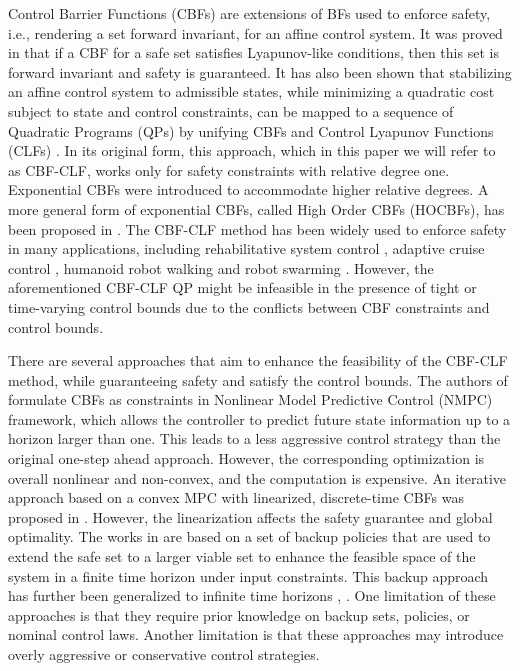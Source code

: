 \documentclass[letterpaper, 10 pt, conference]{ieeeconf}
\theoremstyle{definition}
\begin{document}
Control Barrier Functions (CBFs) are extensions of BFs used to enforce safety, i.e., rendering a set forward invariant, for an affine control system. It was proved in \cite{ames2016control} that if a CBF for a safe set satisfies Lyapunov-like conditions, then this set is forward invariant and safety is guaranteed. It has also been shown that stabilizing an affine control system to admissible states, while minimizing a quadratic cost subject to state and control constraints, can be mapped to a sequence of Quadratic Programs (QPs) \cite{ames2016control} by unifying CBFs and Control Lyapunov Functions (CLFs) \cite{ames2012control}. In its original form, this approach, which in this paper we will refer to as CBF-CLF, works only for safety constraints with relative degree one. Exponential CBFs \cite{nguyen2016exponential} were introduced to accommodate higher relative degrees. A more general form of exponential CBFs, called High Order CBFs (HOCBFs), has been proposed in \cite{xiao2021high}. The CBF-CLF method has been widely used to enforce safety in many applications, including rehabilitative system control \cite{isaly2020zeroing}, adaptive cruise control \cite{ames2016control}, humanoid robot walking \cite{khazoom2022humanoid} and robot swarming \cite{cavorsi2022multi}. However, the aforementioned CBF-CLF QP might be infeasible in the presence of tight or time-varying control bounds due to the conflicts between CBF constraints and control bounds.

There are several approaches that aim to enhance the feasibility of the CBF-CLF method, while guaranteeing safety and satisfy the control bounds. The authors of \cite{zeng2021safety2} formulate CBFs as constraints in Nonlinear Model Predictive Control (NMPC) framework, which allows the controller to predict future state information up to a horizon larger than one. This leads to a less aggressive control strategy than the original
one-step ahead approach. However, the corresponding optimization is overall nonlinear and non-convex, and the computation is expensive. An iterative approach based on a convex MPC with linearized, discrete-time CBFs was proposed in \cite{liu2023iterative}. However,  the linearization affects the safety guarantee and global optimality. The works in  \cite{gurriet2018online,singletary2019online,gurriet2020scalable,chen2021backup} are based on a set of backup policies that are used to extend the safe set to a larger viable set to enhance the feasible space of the system in a finite time horizon under input constraints. This backup approach has further been generalized to infinite time horizons \cite{squires2018constructive}, \cite{breeden2021high}. One limitation of these approaches is that they require prior knowledge on backup sets, policies, or nominal control laws. Another limitation is that these approaches may introduce overly aggressive or conservative control strategies. 
\end{document}
